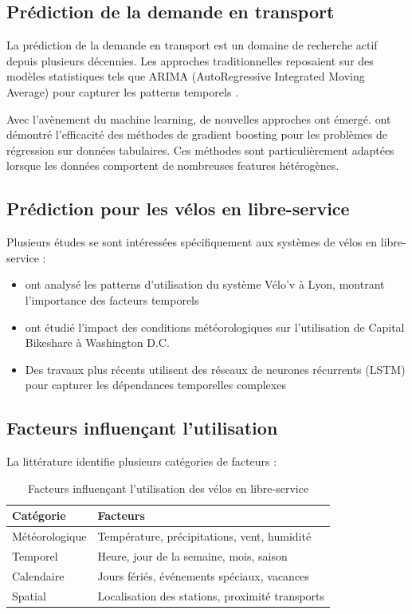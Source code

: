 \documentclass[12pt,a4paper]{article}
\begin{document}
\subsection{Prédiction de la demande en transport}

La prédiction de la demande en transport est un domaine de recherche actif depuis plusieurs décennies. Les approches traditionnelles reposaient sur des modèles statistiques tels que ARIMA (AutoRegressive Integrated Moving Average) pour capturer les patterns temporels \citep{box2015time}.

Avec l'avènement du machine learning, de nouvelles approches ont émergé. \cite{chen2016xgboost} ont démontré l'efficacité des méthodes de gradient boosting pour les problèmes de régression sur données tabulaires. Ces méthodes sont particulièrement adaptées lorsque les données comportent de nombreuses features hétérogènes.

\subsection{Prédiction pour les vélos en libre-service}

Plusieurs études se sont intéressées spécifiquement aux systèmes de vélos en libre-service :

\begin{itemize}
    \item \cite{borgnat2011shared} ont analysé les patterns d'utilisation du système Vélo'v à Lyon, montrant l'importance des facteurs temporels
    \item \cite{gebhart2014impact} ont étudié l'impact des conditions météorologiques sur l'utilisation de Capital Bikeshare à Washington D.C.
    \item Des travaux plus récents utilisent des réseaux de neurones récurrents (LSTM) pour capturer les dépendances temporelles complexes
\end{itemize}

\subsection{Facteurs influençant l'utilisation}

La littérature identifie plusieurs catégories de facteurs :

\begin{table}[H]
\centering
\caption{Facteurs influençant l'utilisation des vélos en libre-service}
\label{tab:factors}
\begin{tabular}{lp{8cm}}
\toprule
\textbf{Catégorie} & \textbf{Facteurs} \\
\midrule
Météorologique & Température, précipitations, vent, humidité \\
Temporel & Heure, jour de la semaine, mois, saison \\
Calendaire & Jours fériés, événements spéciaux, vacances \\
Spatial & Localisation des stations, proximité transports \\
\bottomrule
\end{tabular}
\end{table}
\end{document}
